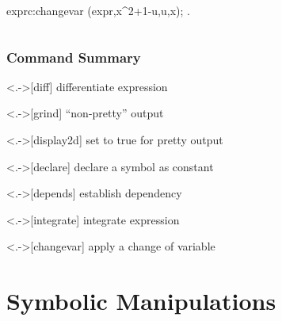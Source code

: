 \documentclass[12pt,usenames,pdftex]{beamer}
\begin{document}
\begin{frame}
{\begin{columns}
\begin{column}
\begin{maxima}
          exprc:changevar (expr,x^2+1-u,u,x);
\maximaoutput*
\m  {}\big. \\
        \end{maxima}        
      \end{column}
    \end{columns}
  }
\end{frame}

\begin{frame}
  \frametitle{Command Summary }
  \begin{description}
  \item<.->[diff] differentiate expression
  \item<.->[grind] ``non-pretty'' output
  \item<.->[display2d] set to true for pretty output
  \item<.->[declare] declare a symbol as constant
  \item<.->[depends] establish dependency
  \item<.->[integrate] integrate expression
  \item<.->[changevar] apply a change of variable
  \end{description}
\end{frame}

\section{Symbolic Manipulations}
\end{document}
